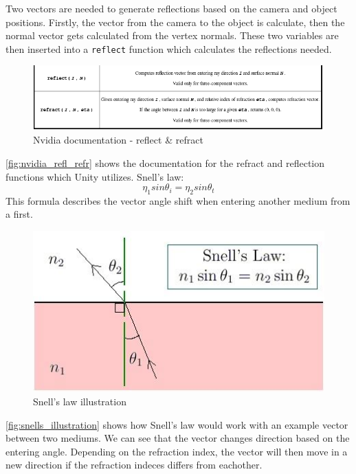 \documentclass{article}
\begin{document}
Two vectors are needed to generate reflections based on the camera and object positions. Firstly, the vector from the camera to the object is calculate, then the normal vector gets calculated from the vertex normals. These two variables are then inserted into a \texttt{reflect} function which calculates the reflections needed.
\begin{figure}[H]
    \centering
    \includegraphics[width=\textwidth]{img/nvidia}
	\caption{Nvidia documentation - reflect \& refract}
    \label{fig:nvidia_refl_refr}
\end{figure}
\autoref{fig:nvidia_refl_refr} shows the documentation for the refract and reflection functions which Unity utilizes.
Snell's law:
$$ \eta_1 sin\theta_i = \eta_2 sin\theta_t $$
This formula describes the vector angle shift when entering another medium from a first.
\begin{figure}[H]
    \centering
	\includegraphics[width=.75\textwidth]{img/snell}
	\caption{Snell's law illustration\protect\footnotemark}
    \label{fig:snells_illustration}
\end{figure}
\autoref{fig:snells_illustration} shows how Snell's law would work with an example vector between two mediums. We can see that the vector changes direction based on the entering angle. Depending on the refraction index, the vector will then move in a new direction if the refraction indeces differs from eachother.
\end{document}
